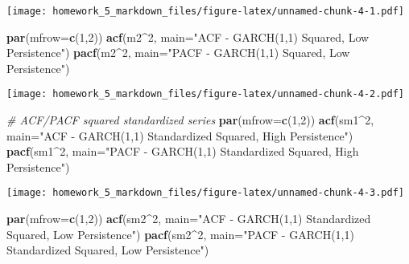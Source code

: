 \documentclass[]{article}
\newenvironment{Shaded}{\begin{snugshade}}{\end{snugshade}}
\newcommand{\KeywordTok}[1]{\textcolor[rgb]{0.13,0.29,0.53}{\textbf{#1}}}
\newcommand{\DataTypeTok}[1]{\textcolor[rgb]{0.13,0.29,0.53}{#1}}
\newcommand{\DecValTok}[1]{\textcolor[rgb]{0.00,0.00,0.81}{#1}}
\newcommand{\StringTok}[1]{\textcolor[rgb]{0.31,0.60,0.02}{#1}}
\newcommand{\CommentTok}[1]{\textcolor[rgb]{0.56,0.35,0.01}{\textit{#1}}}
\newcommand{\OperatorTok}[1]{\textcolor[rgb]{0.81,0.36,0.00}{\textbf{#1}}}
\newcommand{\NormalTok}[1]{#1}
\begin{document}
\texttt{[image: homework\_5\_markdown\_files/figure-latex/unnamed-chunk-4-1.pdf]}

\begin{Shaded}
\begin{Highlighting}[]
\KeywordTok{par}\NormalTok{(}\DataTypeTok{mfrow=}\KeywordTok{c}\NormalTok{(}\DecValTok{1}\NormalTok{,}\DecValTok{2}\NormalTok{))}
\KeywordTok{acf}\NormalTok{(m2}\OperatorTok{^}\DecValTok{2}\NormalTok{, }\DataTypeTok{main=}\StringTok{"ACF - GARCH(1,1) Squared, Low Persistence"}\NormalTok{)}
\KeywordTok{pacf}\NormalTok{(m2}\OperatorTok{^}\DecValTok{2}\NormalTok{, }\DataTypeTok{main=}\StringTok{"PACF - GARCH(1,1) Squared, Low Persistence"}\NormalTok{)}
\end{Highlighting}
\end{Shaded}

\texttt{[image: homework\_5\_markdown\_files/figure-latex/unnamed-chunk-4-2.pdf]}

\begin{Shaded}
\begin{Highlighting}[]
\CommentTok{# ACF/PACF squared standardized series}
\KeywordTok{par}\NormalTok{(}\DataTypeTok{mfrow=}\KeywordTok{c}\NormalTok{(}\DecValTok{1}\NormalTok{,}\DecValTok{2}\NormalTok{))}
\KeywordTok{acf}\NormalTok{(sm1}\OperatorTok{^}\DecValTok{2}\NormalTok{, }\DataTypeTok{main=}\StringTok{"ACF - GARCH(1,1) Standardized Squared, High Persistence"}\NormalTok{)}
\KeywordTok{pacf}\NormalTok{(sm1}\OperatorTok{^}\DecValTok{2}\NormalTok{, }\DataTypeTok{main=}\StringTok{"PACF - GARCH(1,1) Standardized Squared, High Persistence"}\NormalTok{)}
\end{Highlighting}
\end{Shaded}

\texttt{[image: homework\_5\_markdown\_files/figure-latex/unnamed-chunk-4-3.pdf]}

\begin{Shaded}
\begin{Highlighting}[]
\KeywordTok{par}\NormalTok{(}\DataTypeTok{mfrow=}\KeywordTok{c}\NormalTok{(}\DecValTok{1}\NormalTok{,}\DecValTok{2}\NormalTok{))}
\KeywordTok{acf}\NormalTok{(sm2}\OperatorTok{^}\DecValTok{2}\NormalTok{, }\DataTypeTok{main=}\StringTok{"ACF - GARCH(1,1) Standardized Squared, Low Persistence"}\NormalTok{)}
\KeywordTok{pacf}\NormalTok{(sm2}\OperatorTok{^}\DecValTok{2}\NormalTok{, }\DataTypeTok{main=}\StringTok{"PACF - GARCH(1,1) Standardized Squared, Low Persistence"}\NormalTok{)}
\end{Highlighting}
\end{Shaded}
\end{document}
